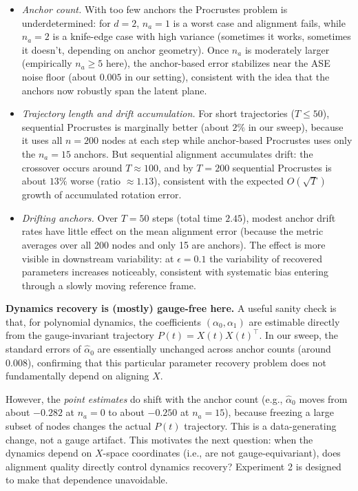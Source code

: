 \documentclass{article}
\theoremstyle{plain}
\theoremstyle{definition}
\theoremstyle{remark}
\begin{document}
\begin{itemize}
\item \emph{Anchor count.} With too few anchors the Procrustes problem is underdetermined: for $d=2$, $n_a=1$ is a worst case and alignment fails, while $n_a=2$ is a knife-edge case with high variance (sometimes it works, sometimes it doesn't, depending on anchor geometry). Once $n_a$ is moderately larger (empirically $n_a \ge 5$ here), the anchor-based error stabilizes near the ASE noise floor (about $0.005$ in our setting), consistent with the idea that the anchors now robustly span the latent plane.

\item \emph{Trajectory length and drift accumulation.} For short trajectories ($T \le 50$), sequential Procrustes is marginally better (about $2\%$ in our sweep), because it uses all $n=200$ nodes at each step while anchor-based Procrustes uses only the $n_a = 15$ anchors. But sequential alignment accumulates drift: the crossover occurs around $T \approx 100$, and by $T = 200$ sequential Procrustes is about $13\%$ worse (ratio $\approx 1.13$), consistent with the expected $O(\sqrt{T})$ growth of accumulated rotation error.

\item \emph{Drifting anchors.} Over $T=50$ steps (total time $2.45$), modest anchor drift rates have little effect on the mean alignment error (because the metric averages over all 200 nodes and only 15 are anchors). The effect is more visible in downstream variability: at $\epsilon = 0.1$ the variability of recovered parameters increases noticeably, consistent with systematic bias entering through a slowly moving reference frame.
\end{itemize}

\textbf{Dynamics recovery is (mostly) gauge-free here.}
A useful sanity check is that, for polynomial dynamics, the coefficients $(\alpha_0, \alpha_1)$ are estimable directly from the gauge-invariant trajectory $P(t) = X(t) X(t)^\top$.
In our sweep, the standard errors of $\hat{\alpha}_0$ are essentially unchanged across anchor counts (around $0.008$), confirming that this particular parameter recovery problem does not fundamentally depend on aligning $X$.

However, the \emph{point estimates} do shift with the anchor count (e.g., $\hat{\alpha}_0$ moves from about $-0.282$ at $n_a=0$ to about $-0.250$ at $n_a=15$), because freezing a large subset of nodes changes the actual $P(t)$ trajectory. This is a data-generating change, not a gauge artifact.
This motivates the next question: when the dynamics depend on $X$-space coordinates (i.e., are not gauge-equivariant), does alignment quality directly control dynamics recovery?
Experiment 2 is designed to make that dependence unavoidable.
\end{document}
